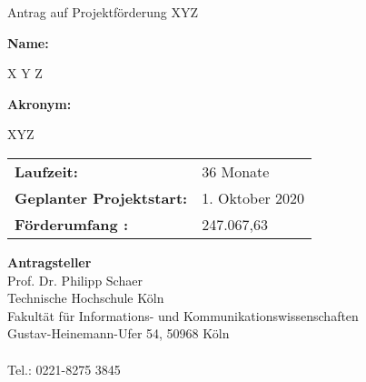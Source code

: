 \documentclass{dfg}
\begin{document}
%

\thispagestyle{empty}


\vspace*{-10ex}
\enlargethispage{4ex}

\huge
Antrag auf Projektförderung XYZ
\par
\large

\normalsize


\vspace{8ex}
{\bfseries\sffamily Name:}\par
X Y Z

\vspace{2ex}
{\bfseries\sffamily Akronym:}\par
XYZ

\vspace{8ex}
\renewcommand{\arraystretch}{1.1}
\begin{tabular}{@{}l@{\quad}l}
\bfseries\sffamily Laufzeit:                & 36 Monate \\
\bfseries\sffamily Geplanter Projektstart:  & 1. Oktober 2020 \\
\bfseries\sffamily Förderumfang :           & 247.067,63\EUR{} \\ 
\end{tabular}

\vfill

{\bfseries\sffamily Antragsteller} \\[1ex]

Prof. Dr. Philipp Schaer \\[1ex]
Technische Hochschule Köln \\
Fakultät für Informations- und Kommunikationswissenschaften \\[1ex]
Gustav-Heinemann-Ufer 54, 50968 Köln \\
  \\
Tel.: 0221-8275 3845 \\[2ex]


\clearpage
\pagestyle{headings}
\end{document}
